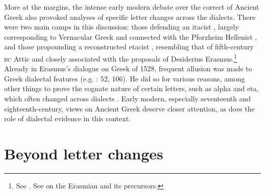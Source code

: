 More at the margins, the intense early modern debate over the correct  of Ancient Greek also provoked analyses of specific letter changes across the dialects. There were two main camps in this discussion: those defending an itacist , largely corresponding to Vernacular Greek  and connected with the Pforzheim Hellenist , and those propounding a reconstructed etacist , resembling that of fifth-century \textsc{bc} Attic and closely associated with the proposals of Desiderius Erasmus.\footnote{See \citet[130]{Sandys1908}. See \citet{Bywater1908} on the Erasmian  and its precursors.} Already in Erasmus’s dialogue on Greek  of 1528, frequent allusion was made to Greek dialectal features (e.g. \citealt{Erasmus1528}: 52, 106). He did so for various reasons, among other things to prove the cognate nature of certain letters, such as alpha and eta, which often changed across dialects \citep[62]{Erasmus1528}. Early modern, especially seventeenth and eighteenth-century, views on Ancient Greek  deserve closer attention, as does the role of dialectal evidence in this context.

\section{Beyond letter changes}\label{sec:6.3}


